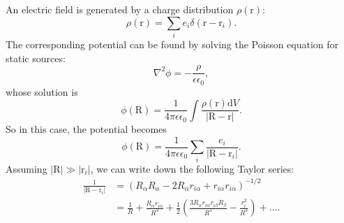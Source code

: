 \documentclass[amsmath,amssymb,notitlepage,11pt,reprint,aip]{revtex4-1}
\newcommand{\bvec}[1]{\bm{\mathrm{#1}}}
\newcommand{\dl}{\mathrm{d}}
\begin{document}
An electric field is generated by a charge distribution $\rho(\bvec{r})$:
\begin{equation}
    \rho(\bvec{r}) = \sum_ie_i\delta(\bvec{r}-\bvec{r}_i).
\end{equation}
The corresponding potential can be found by solving the Poisson equation for static sources:
\begin{equation}
    \nabla^2\phi=-\frac{\rho}{\epsilon\epsilon_0},
\end{equation}
whose solution is
\begin{equation}
    \phi(\bvec{R}) = \frac{1}{4\pi\epsilon\epsilon_0}\int\frac{\rho(\bvec{r})\dl V}{|\bvec{R}-\bvec{r}|}.
\end{equation}
So in this case, the potential becomes
\begin{equation}
    \phi(\bvec{R}) = \frac{1}{4\pi\epsilon\epsilon_0}\sum_i\frac{e_i}{|\bvec{R}-\bvec{r}_i|}.
\end{equation}
Assuming $|\bvec{R}|\gg|\bvec{r}_i|$, we can write down the following Taylor series:
\begin{align}
    \frac{1}{|\bvec{R}-\bvec{r}_i|} &= (R_{\alpha}R_{\alpha}-2R_{\alpha}r_{i\alpha}+r_{i\alpha}r_{i\alpha})^{-1/2} \\
    &= \frac{1}{R} + \frac{R_{\alpha}r_{i\alpha}}{R^3} + \frac{1}{2}\left(\frac{3R_{\alpha}r_{i\alpha}r_{i\beta}R_{\beta}}{R^5}-\frac{r_{i}^2}{R^3}\right) + \dots.\nonumber
\end{align}


\end{document}
